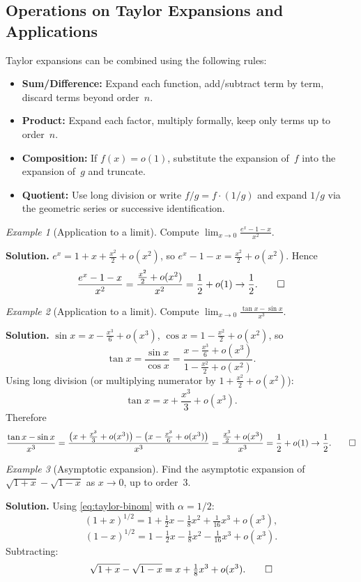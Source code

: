 \documentclass[12pt,a4paper,openany]{book}
\theoremstyle{definition}
\theoremstyle{remark}
\newtheorem{example}{Example}[chapter]
\begin{document}
\subsection{Operations on Taylor Expansions and Applications}

Taylor expansions can be combined using the following rules:
\begin{itemize}
\item \textbf{Sum/Difference:} Expand each function, add/subtract
  term by term, discard terms beyond order~$n$.
\item \textbf{Product:} Expand each factor, multiply formally, keep
  only terms up to order~$n$.
\item \textbf{Composition:} If $f(x)=o(1)$, substitute the expansion
  of~$f$ into the expansion of~$g$ and truncate.
\item \textbf{Quotient:} Use long division or write
  $f/g = f\cdot(1/g)$ and expand $1/g$ via the geometric series or
  successive identification.
\end{itemize}

\begin{example}[Application to a limit]\label{ex:taylor-limit-1}
Compute $\displaystyle\lim_{x\to 0}\frac{e^x - 1 - x}{x^2}$.

\medskip
\textbf{Solution.}\;
$e^x = 1 + x + \frac{x^2}{2} + o(x^2)$, so
$e^x - 1 - x = \frac{x^2}{2} + o(x^2)$.  Hence
\[
  \frac{e^x - 1 - x}{x^2}
  = \frac{\frac{x^2}{2}+o(x^2)}{x^2}
  = \frac{1}{2} + o(1) \to \frac{1}{2}. \qed
\]
\end{example}

\begin{example}[Application to a limit]\label{ex:taylor-limit-2}
Compute $\displaystyle\lim_{x\to 0}\frac{\tan x - \sin x}{x^3}$.

\medskip
\textbf{Solution.}\;
$\sin x = x - \frac{x^3}{6} + o(x^3)$,\;
$\cos x = 1 - \frac{x^2}{2} + o(x^2)$, so
\[
  \tan x = \frac{\sin x}{\cos x}
  = \frac{x - \frac{x^3}{6}+o(x^3)}{1-\frac{x^2}{2}+o(x^2)}.
\]
Using long division (or multiplying numerator by
$1+\frac{x^2}{2}+o(x^2)$):
\[
  \tan x = x + \frac{x^3}{3} + o(x^3).
\]
Therefore
\[
  \frac{\tan x - \sin x}{x^3}
  = \frac{\bigl(x+\frac{x^3}{3}+o(x^3)\bigr)
    -\bigl(x-\frac{x^3}{6}+o(x^3)\bigr)}{x^3}
  = \frac{\frac{x^3}{2}+o(x^3)}{x^3}
  = \frac{1}{2}+o(1) \to \frac{1}{2}. \qed
\]
\end{example}

\begin{example}[Asymptotic expansion]\label{ex:taylor-limit-3}
Find the asymptotic expansion of $\sqrt{1+x}-\sqrt{1-x}$ as $x\to 0$,
up to order~3.

\medskip
\textbf{Solution.}\;
Using \eqref{eq:taylor-binom} with $\alpha=1/2$:
\[
  (1+x)^{1/2} = 1 + \tfrac{1}{2}x - \tfrac{1}{8}x^2
  + \tfrac{1}{16}x^3 + o(x^3),
\]
\[
  (1-x)^{1/2} = 1 - \tfrac{1}{2}x - \tfrac{1}{8}x^2
  - \tfrac{1}{16}x^3 + o(x^3).
\]
Subtracting:
\[
  \sqrt{1+x}-\sqrt{1-x}
  = x + \tfrac{1}{8}x^3 + o(x^3). \qed
\]
\end{example}
\end{document}
